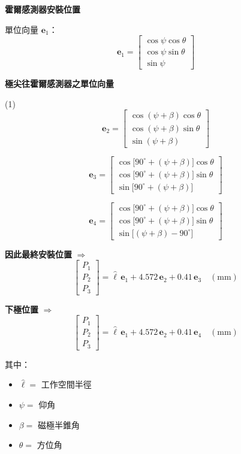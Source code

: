 \documentclass[12pt]{article}
\begin{document}
{\large\textbf{霍爾感測器安裝位置}}

\medskip
單位向量 $\mathbf{e}_1$：
\[
\mathbf{e}_1 =
\begin{bmatrix}
\cos\psi\cos\theta \\[2pt]
\cos\psi\sin\theta \\[2pt]
\sin\psi
\end{bmatrix}
\]

\vspace{1em}

{\large\textbf{極尖往霍爾感測器之單位向量}}

\medskip
(1)\quad
\[
\mathbf{e}_2 =
\begin{bmatrix}
\cos(\psi+\beta)\cos\theta \\[2pt]
\cos(\psi+\beta)\sin\theta \\[2pt]
\sin(\psi+\beta)
\end{bmatrix}
\]

\[
\mathbf{e}_3 =
\begin{bmatrix}
\cos\!\big[90^\circ+(\psi+\beta)\big]\cos\theta \\[2pt]
\cos\!\big[90^\circ+(\psi+\beta)\big]\sin\theta \\[2pt]
\sin\!\big[90^\circ+(\psi+\beta)\big]
\end{bmatrix}
\]

\[
\mathbf{e}_4 =
\begin{bmatrix}
\cos\!\big[90^\circ+(\psi+\beta)\big]\cos\theta \\[2pt]
\cos\!\big[90^\circ+(\psi+\beta)\big]\sin\theta \\[2pt]
\sin\!\big[(\psi+\beta)-90^\circ\big]
\end{bmatrix}
\]

\vspace{1em}

{\large\textbf{因此最終安裝位置}} $\Rightarrow$
\[
\begin{bmatrix} P_1 \\ P_2 \\ P_3 \end{bmatrix}
= \hat{\ell}\,\mathbf{e}_1 + 4.572\,\mathbf{e}_2 + 0.41\,\mathbf{e}_3 \quad (\mathrm{mm})
\]

\vspace{1em}

{\large\textbf{下極位置}} $\Rightarrow$
\[
\begin{bmatrix} P_1 \\ P_2 \\ P_3 \end{bmatrix}
= \hat{\ell}\,\mathbf{e}_1 + 4.572\,\mathbf{e}_2 + 0.41\,\mathbf{e}_4 \quad (\mathrm{mm})
\]

其中：
\begin{itemize}[leftmargin=2.5em,topsep=2pt,itemsep=1pt]
  \item $\hat{\ell} = $ 工作空間半徑
  \item $\psi = $ 仰角
  \item $\beta = $ 磁極半錐角
  \item $\theta = $ 方位角
\end{itemize}
\end{document}
